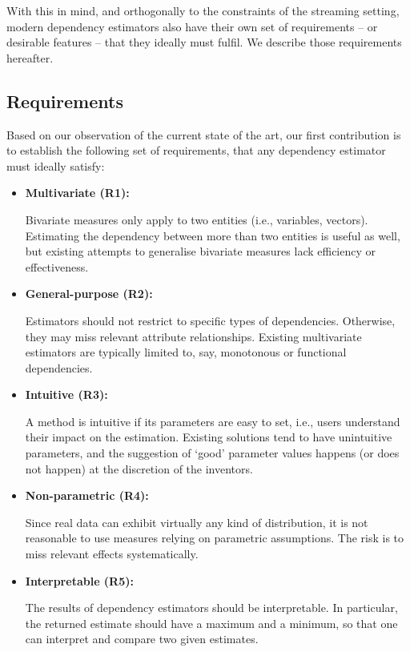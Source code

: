 With this in mind, and orthogonally to the constraints of the streaming setting, modern dependency estimators also have their own set of requirements -- or desirable features -- that they ideally must fulfil. We describe those requirements hereafter. 

\subsection{Requirements}

Based on our observation of the current state of the art, our first contribution is to establish the following set of requirements, that any dependency estimator must ideally satisfy:

\begin{itemize}[noitemsep]
	\item \hypertarget{R1}{\textbf{Multivariate (R1):}} Bivariate measures only apply to two entities (i.e., variables, vectors). Estimating the dependency between more than two entities is useful as well, but existing attempts to generalise bivariate measures lack efficiency or effectiveness. %
	
	\item \hypertarget{R2}{\textbf{General-purpose (R2):}} Estimators should not restrict to specific types of dependencies. Otherwise, they may miss relevant attribute relationships. Existing multivariate estimators are typically limited to, say, monotonous or functional dependencies. 
	
	\item \hypertarget{R3}{\textbf{Intuitive (R3):}} A method is intuitive if its parameters are easy to set, i.e., users understand their impact on the estimation. 
	Existing solutions tend to have unintuitive parameters, and the suggestion of `good' parameter values happens (or does not happen) at the discretion of the inventors. 
	
	\item \hypertarget{R4}{\textbf{Non-parametric (R4):}} Since real data can exhibit virtually any kind of distribution, it is not reasonable to use measures relying on parametric assumptions. The risk is to miss relevant effects systematically.
	
	\item \hypertarget{R5}{\textbf{Interpretable (R5):}} The results of dependency estimators should be interpretable. In particular, the returned estimate should have a maximum and a minimum, so that one can interpret and compare two given estimates.
	

\end{itemize}

